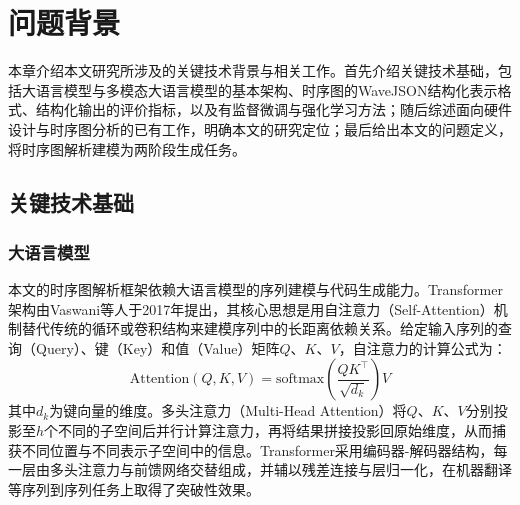 
\chapter{问题背景}

本章介绍本文研究所涉及的关键技术背景与相关工作。首先介绍关键技术基础，包括大语言模型与多模态大语言模型的基本架构、时序图的WaveJSON结构化表示格式、结构化输出的评价指标，以及有监督微调与强化学习方法；随后综述面向硬件设计与时序图分析的已有工作，明确本文的研究定位；最后给出本文的问题定义，将时序图解析建模为两阶段生成任务。

\section{关键技术基础}

\subsection{大语言模型}

本文的时序图解析框架依赖大语言模型的序列建模与代码生成能力。Transformer架构由Vaswani等人于2017年提出，其核心思想是用自注意力（Self-Attention）机制替代传统的循环或卷积结构来建模序列中的长距离依赖关系。给定输入序列的查询（Query）、键（Key）和值（Value）矩阵$Q$、$K$、$V$，自注意力的计算公式为：
\begin{equation}
  \text{Attention}(Q, K, V) = \text{softmax}\left(\frac{QK^\top}{\sqrt{d_k}}\right)V
\end{equation}
其中$d_k$为键向量的维度。多头注意力（Multi-Head Attention）将$Q$、$K$、$V$分别投影至$h$个不同的子空间后并行计算注意力，再将结果拼接投影回原始维度，从而捕获不同位置与不同表示子空间中的信息。Transformer采用编码器-解码器结构，每一层由多头注意力与前馈网络交替组成，并辅以残差连接与层归一化，在机器翻译等序列到序列任务上取得了突破性效果。

